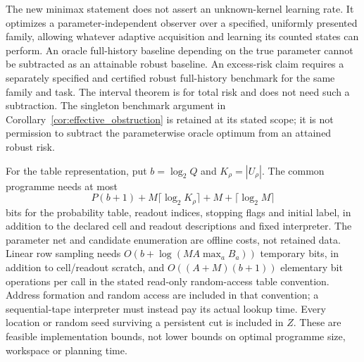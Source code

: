 The new minimax statement does not assert an unknown-kernel learning rate. It optimizes a parameter-independent observer over a specified, uniformly presented family, allowing whatever adaptive acquisition and learning its counted states can perform. An oracle full-history baseline depending on the true parameter cannot be subtracted as an attainable robust baseline. An excess-risk claim requires a separately specified and certified robust full-history benchmark for the same family and task. The interval theorem is for total risk and does not need such a subtraction. The singleton benchmark argument in Corollary~\ref{cor:effective_obstruction} is retained at its stated scope; it is not permission to subtract the parameterwise oracle optimum from an attained robust risk.

For the table representation, put $b=\log_2Q$ and $K_\rho=|U_\rho|$. The common programme needs at most
\[
 P(b+1)+M\lceil\log_2K_\rho\rceil+M+\lceil\log_2M\rceil
\]
bits for the probability table, readout indices, stopping flags and initial label, in addition to the declared cell and readout descriptions and fixed interpreter. The parameter net and candidate enumeration are offline costs, not retained data. Linear row sampling needs $O(b+\log(MA\max_aB_a))$ temporary bits, in addition to cell/readout scratch, and $O((A+M)(b+1))$ elementary bit operations per call in the stated read-only random-access table convention. Address formation and random access are included in that convention; a sequential-tape interpreter must instead pay its actual lookup time. Every location or random seed surviving a persistent cut is included in $Z$. These are feasible implementation bounds, not lower bounds on optimal programme size, workspace or planning time.
